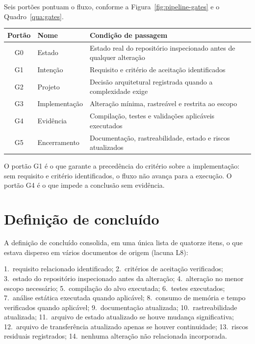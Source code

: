 Seis portões pontuam o fluxo, conforme a Figura~\ref{fig:pipeline-gates} e o
Quadro~\ref{qua:gates}.



\begin{quadro}[htb]
	\caption{Portões de verificação do framework}
	\label{qua:gates}
	\centering
	\footnotesize
	\begin{tabularx}{\textwidth}{@{}c p{3.2cm} X@{}}
		\toprule
		\textbf{Portão} & \textbf{Nome} & \textbf{Condição de passagem} \\
		\midrule
		G0 & Estado & Estado real do repositório inspecionado antes de qualquer alteração \\
		\addlinespace
		G1 & Intenção & Requisito e critério de aceitação identificados \\
		\addlinespace
		G2 & Projeto & Decisão arquitetural registrada quando a complexidade exige \\
		\addlinespace
		G3 & Implementação & Alteração mínima, rastreável e restrita ao escopo \\
		\addlinespace
		G4 & Evidência & Compilação, testes e validações aplicáveis executados \\
		\addlinespace
		G5 & Encerramento & Documentação, rastreabilidade, estado e riscos atualizados \\
		\bottomrule
	\end{tabularx}
\end{quadro}

O portão G1 é o que garante a precedência do critério sobre a implementação: sem
requisito e critério identificados, o fluxo não avança para a execução. O portão
G4 é o que impede a conclusão sem evidência.

\section{Definição de concluído}
\label{sec:fw-dod}

A definição de concluído consolida, em uma única lista de quatorze itens, o que
estava disperso em vários documentos de origem (lacuna L8):

1.~requisito relacionado identificado; 2.~critérios de aceitação verificados;
3.~estado do repositório inspecionado antes da alteração; 4.~alteração no menor
escopo necessário; 5.~compilação do alvo executada; 6.~testes executados;
7.~análise estática executada quando aplicável; 8.~consumo de memória e tempo
verificados quando aplicável; 9.~documentação atualizada; 10.~rastreabilidade
atualizada; 11.~arquivo de estado atualizado se houve mudança significativa;
12.~arquivo de transferência atualizado apenas se houver continuidade;
13.~riscos residuais registrados; 14.~nenhuma alteração não relacionada
incorporada.

